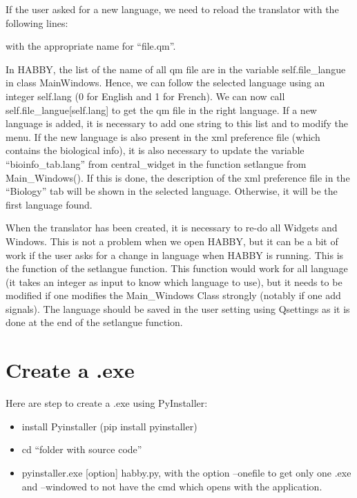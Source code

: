\documentclass[letterpaper,10pt,english]{sphinxmanual}
\begin{document}

If the user asked for a new language, we need to reload the translator with the following lines:
\begin{quote}



\end{quote}

with the appropriate name for “file.qm”.

In HABBY, the list of the name of all qm file are in the variable self.file\_langue
in class MainWindows. Hence, we can follow the selected language using an integer self.lang
(0 for English and 1 for French). We can now call self.file\_langue{[}self.lang{]} to get the qm
file in the right language. If a new language is added, it is necessary to add one string to this
list and to modify the menu. If the new language is also present in the xml preference file
(which contains the biological info), it is also necessary to update the variable ``bioinfo\_tab.lang''
from central\_widget in the function setlangue from Main\_Windows(). If this is done, the description of
the xml preference file in the ``Biology'' tab will be shown in the selected language. Otherwise, it will be
the first language found.

When the translator has been created, it is necessary to re-do all Widgets and Windows. This is not a problem when we open HABBY, but it can be a bit of work if the user asks for a change in language when HABBY is running. This is the function of the setlangue function. This function would work for all language (it takes an integer as input to know which language to use), but it needs to be modified if one modifies the Main\_Windows Class strongly (notably if one add signals).
The language should be saved in the user setting using Qsettings as it is done at the end of the
setlangue function.


\section{Create a .exe}
\label{\detokenize{index:create-a-exe}}
Here are step to create a .exe using PyInstaller:
\begin{itemize}
\item {} 
install Pyinstaller (pip install pyinstaller)

\item {} 
cd ``folder with source code''

\item {} 
pyinstaller.exe {[}option{]} habby.py, with the option --onefile to get only one .exe and --windowed to not have the cmd which opens with the application.

\end{itemize}
\end{document}
